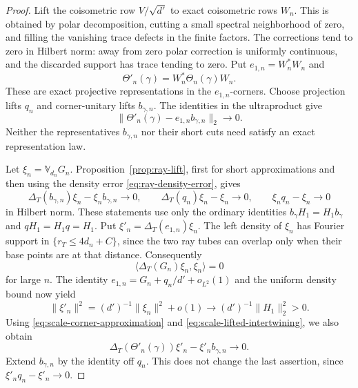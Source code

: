 \begin{proof}
Lift the coisometric row \(V/\sqrt{d'}\) to exact
coisometric rows \(W_n\).  This is obtained by polar
decomposition, cutting a small spectral neighborhood of
zero, and filling the vanishing trace defects in the finite
factors.  The corrections tend to zero in Hilbert norm:
away from zero polar correction is uniformly continuous,
and the discarded support has trace tending to zero.
Put \(e_{1,n}=W_n^*W_n\) and
\[
 \Theta'_n(\gamma)=W_n^*\Theta_n(\gamma)W_n .
\]
These are exact projective representations in the
\(e_{1,n}\)-corners.  Choose projection lifts \(q_n\)
and corner-unitary lifts \(b_{\gamma,n}\).  The identities
in the ultraproduct give
\begin{equation}
 \|\Theta'_n(\gamma)-e_{1,n}b_{\gamma,n}\|_2\longrightarrow0.
 \label{eq:scale-corner-approximation}
\end{equation}
Neither the representatives \(b_{\gamma,n}\) nor their short
cuts need satisfy an exact representation law.

Let \(\xi_n=\mathbb V_{d_n}G_n\).
Proposition~\ref{prop:ray-lift}, first for short
approximations and then using the density error
\eqref{eq:ray-density-error}, gives
\begin{equation}
 \Delta_T(b_{\gamma,n})\xi_n-\xi_nb_{\gamma,n}\to0,\qquad
 \Delta_T(q_n)\xi_n-\xi_n\to0,\qquad
 \xi_nq_n-\xi_n\to0
 \label{eq:scale-lifted-intertwining}
\end{equation}
in Hilbert norm.  These statements use only the ordinary
identities \(b_\gamma H_1=H_1b_\gamma\) and \(qH_1=H_1q=H_1\).
Put \(\xi'_n=\Delta_T(e_{1,n})\xi_n\).
The left density of \(\xi_n\) has Fourier support in
\(\{r_T\le4d_n+C\}\), since the two ray tubes can overlap
only when their base points are at that distance.
Consequently
\[
 \langle\Delta_T(G_n)\xi_n,\xi_n\rangle=0
\]
for large \(n\).  The identity
\(e_{1,n}=G_n+q_n/d'+o_{L^2}(1)\) and the uniform density
bound now yield
\begin{equation}
 \|\xi'_n\|^2=(d')^{-1}\|\xi_n\|^2+o(1)
 \longrightarrow(d')^{-1}\|H_1\|_2^2>0 .
 \label{eq:scale-nonzero-lift}
\end{equation}
Using \eqref{eq:scale-corner-approximation} and
\eqref{eq:scale-lifted-intertwining}, we also obtain
\begin{equation}
 \Delta_T(\Theta'_n(\gamma))\xi'_n-\xi'_nb_{\gamma,n}\to0.
 \label{eq:scale-almost-intertwiner}
\end{equation}
Extend \(b_{\gamma,n}\) by the identity off \(q_n\).
This does not change the last assertion, since
\(\xi'_nq_n-\xi'_n\to0\).


\end{proof}
